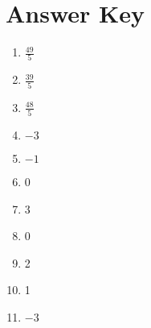\newpage

\section{Answer Key}

\begin{enumerate}
	\item $\frac{49}{5}$
    \item $\frac{39}{5}$
    \item $\frac{48}{5}$
    \item $-3$
    \item $-1$
    \item 0 
    \item 3
    \item 0
    \item 2
    \item 1
    \item $-3$
\end{enumerate}